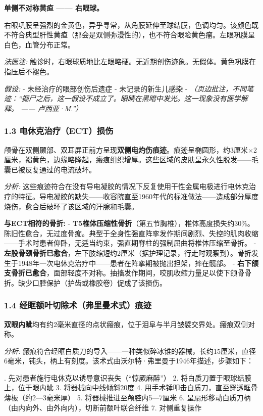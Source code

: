 \noindent \textbf{单侧不对称黄疸 —— 右眼球。}

\noindent 右眼巩膜呈强烈的金黄色，异乎寻常，从角膜延伸至球结膜，色调均匀。该颜色既不符合典型肝性黄疸（那会是双侧弥漫性的），也不符合眼睑黄色瘤。左眼巩膜呈白色，血管分布正常。

\noindent \textit{法医注:} 触诊时，右眼球质地比左眼略硬。无近期创伤迹象。无假体。黄色巩膜在指压后不褪色。

\noindent \textit{假设:}
- 未经治疗的眼部创伤后遗症
- 未记录的新生儿感染
- \textit{（页边批注，不同笔迹：“掘尸之后，这一假设不成立了。眼睛在黑暗中发光。这一现象没有医学解释。 —— 卢西亚·M.”）}

\subsubsection*{1.3 电休克治疗（ECT）损伤}

\noindent 颅骨在双侧颞部、双耳屏正前方呈现\textbf{双侧电灼伤痕迹}。痕迹呈椭圆形，约3厘米×2厘米，褐黄色，边缘略隆起，瘢痕组织增厚。这些区域的皮肤呈永久性脱发——毛囊已被反复通过的电流破坏。

\noindent \textit{分析:} 这些痕迹符合在没有导电凝胶的情况下反复使用干性金属电极进行电休克治疗的特征。导电凝胶的缺失——收容院直至1960年代的标准做法——造成部分厚度烧伤，愈合后破坏了该区域的汗腺和毛囊。

\noindent \textbf{与ECT相符的骨折:}
- \textbf{T5椎体压缩性骨折}（第五节胸椎），椎体高度损失约30\%。陈旧性愈合，无过度骨痂。典型于全身性强直阵挛发作期间剧烈、失控的肌肉收缩——手术时患者仰卧，无适当约束，强直期脊柱的强制屈曲将椎体压缩至骨折。
- \textbf{左股骨颈骨折已愈合}，左下肢缩短约2厘米（据护理记录，行走时观察到）。骨折发生于1948年一次电休克治疗中——患者在阵挛期被抛出担架，摔在髋部。
- \textbf{右下颌支骨折已愈合}，面部轻度不对称。抽搐发作期间，咬肌收缩力量足以使下颌骨骨折。缺少口腔保护（护齿或橡胶卷）促成了该损伤。

\subsubsection*{1.4 经眶额叶切除术（弗里曼术式）痕迹}

\noindent \textbf{双眼内眦}均有约2毫米直径的点状瘢痕，位于泪阜与半月皱襞交界处。瘢痕双侧对称。

\noindent \textit{分析:} 瘢痕符合经眶白质刀的导入——一种类似碎冰锥的器械，长约15厘米，直径6毫米，钝头，柄上有刻度。该术式由沃尔特·弗里曼于1946年描述，步骤如下：

. 先对患者施行电休克以诱导意识丧失（“惊厥麻醉”）
2. 将白质刀置于眼球结膜上，位于眼内眦
3. 将器械向中线倾斜20度
4. 用手术锤叩击白质刀，直至穿透眶骨薄板（约2—3毫米厚）
5. 将器械推进至颅腔内5—7厘米
6. 呈扇形移动白质刀柄（由内向外、由外向内），切断前额叶联合纤维
7. 对侧重复操作


